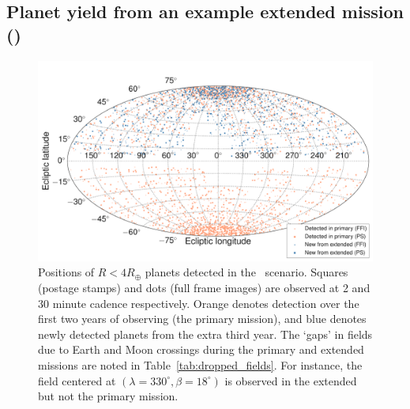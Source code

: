 \subsection{Planet yield from an example extended mission (\rm{\nhemi}) }
\label{sec:results_from_nhemi_extended_mission}

\begin{figure}[t]
	\centering
	\includegraphics[]{figures/skymap_dropped_fields.pdf}
	\caption{Positions of $R<4R_\oplus$ planets detected in the \nhemi\ scenario. Squares (postage stamps) and dots (full frame images) are observed at 2 and 30 minute cadence respectively. Orange denotes detection over the first two years of observing (the primary mission), and blue denotes newly detected planets from the extra third year. The `gaps' in fields due to Earth and Moon crossings during the primary and extended missions are noted in Table~\protect\ref{tab:dropped_fields}. For instance, the field centered at $(\lambda=330^\circ,\beta=18^\circ)$ is observed in the extended but not the primary mission. }
	\label{fig:skymap_nhemi}
\end{figure}
